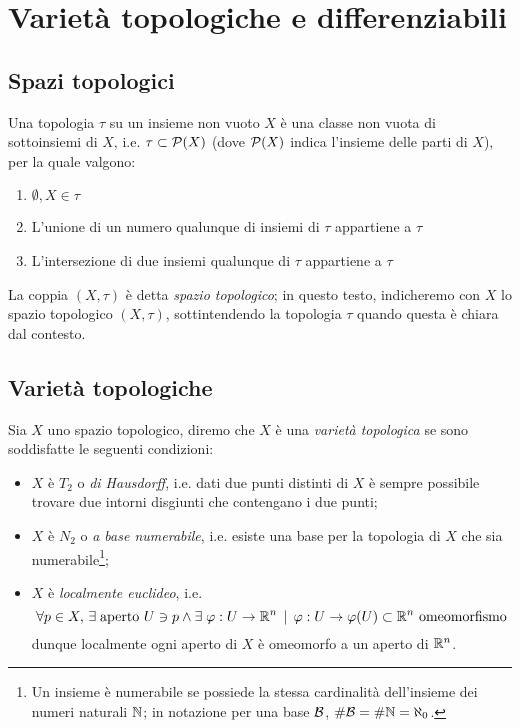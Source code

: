 \section{Varietà topologiche e differenziabili}

\subsection{Spazi topologici}

Una topologia $ \tau $ su un insieme non vuoto $ X $ è una classe non vuota di sottoinsiemi di $ X $, i.e. $ \tau \subset \mathcal{P}(X) $ (dove $ \mathcal{P}(X) $ indica l'insieme delle parti di $ X $), per la quale valgono:

\begin{enumerate}
	\item $ \emptyset, X \in \tau $
	
	\item L'unione di un numero qualunque di insiemi di $ \tau $ appartiene a $ \tau $
	
	\item L'intersezione di due insiemi qualunque di $ \tau $ appartiene a $ \tau $
\end{enumerate}

La coppia $ (X, \tau) $ è detta \textit{spazio topologico}; in questo testo, indicheremo con $ X $ lo spazio topologico $ (X, \tau) $, sottintendendo la topologia $ \tau $ quando questa è chiara dal contesto.

\subsection{Varietà topologiche}

Sia $ X $ uno spazio topologico, diremo che $ X $ è una \textit{varietà topologica} se sono soddisfatte le seguenti condizioni:

\begin{itemize}
	\item $ X $ è $ T_{2} $ o \textit{di Hausdorff}, i.e. dati due punti distinti di $ X $ è sempre possibile trovare due intorni disgiunti che contengano i due punti;
	
	\item $ X $ è $ N_{2} $ o \textit{a base numerabile}, i.e. esiste una base per la topologia di $ X $ che sia numerabile\footnote{%
		Un insieme è numerabile se possiede la stessa cardinalità dell'insieme dei numeri naturali $ \mathbb{N} $; in notazione per una base $ \mathcal{B} $, $ \# \mathcal{B} = \# \mathbb{N} = \aleph_{0} $.%
	};
	
	\item $ X $ è \textit{localmente euclideo}, i.e. 
		\begin{equation}
			\forall p \in X, \, \exists \; \text{aperto } U \ni p \wedge \exists \; \varphi : U \to \mathbb{R}^{n} \, \mid \, \varphi : U \to \varphi(U) \subset \mathbb{R}^{n} \text{ omeomorfismo}
		\end{equation}
		dunque localmente ogni aperto di $ X $ è omeomorfo a un aperto di $ \mathbb{R}^{n} $.
\end{itemize}


